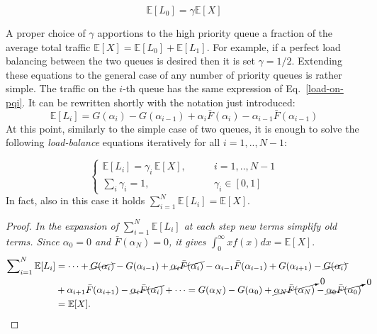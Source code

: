 \begin{equation}
\label{eq:main-gen}
\mathbb{E}[L_0] = \gamma \mathbb E[X] 
\end{equation}

A proper choice of $\gamma$ apportions to the high priority queue a fraction of the average total traffic $\mathbb{E}[X]  = \mathbb{E}[L_0] + \mathbb{E}[L_1]$. For example, if a perfect load balancing between the two queues is desired then it is set $\gamma = 1/2$.
Extending these equations to the general case of any number of priority queues is rather simple. The traffic on the $i$-th queue has the same expression of Eq.~\eqref{load-on-pqi}. It can be rewritten shortly with the notation just introduced:
\[
\mathbb{E}[L_i] = G(\alpha_i) - G(\alpha_{i-1}) + \alpha_i \bar{F}(\alpha_i) -\alpha_{i-1}\bar{F}(\alpha_{i-1})
\]
At this point, similarly to the simple case of two queues, it is enough to solve the following \emph{load-balance} equations iteratively for all $i = 1,..,N-1$:

\begin{equation}\label{eq:main-K-PQ}
\begin{cases}
\mathbb{E}[L_i] = \gamma_i \, \mathbb{E}[X],  \qquad &i = 1,..,N-1 \\
\sum_i \gamma_i = 1, \qquad &\gamma_i \in [0,1]
\end{cases}
\end{equation}
In fact, also in this case it holds $\sum_{i=1}^{N}\mathbb{E}[L_i] = \mathbb{E}[X]$.

\renewcommand{\qedsymbol}{\rule{0.5em}{0.5em}}
\begin{proof}
\label{proof}
\textit{In the expansion of $\sum _{i=1}^{N}\mathbb{E}[L_i]$ at each step new terms simplify old terms. Since $\alpha_{\mathit{0}} = 0$ and $\bar{F}(\alpha_N) = 0$, it gives $\int_{0}^\infty x f(x) dx = \mathbb{E}[X]$}.
\small
\begin{align*}
	\sum\nolimits_{i=1}^{N}\mathbb{E}[L_i] &= \cdots + \cancel{G(\alpha_i)} - G(\alpha_{i-1}) + \cancel{\alpha_i \bar{F}(\alpha_i)} 
	-\alpha_{i-1}\bar{F}(\alpha_{i-1}) + G(\alpha_{i+1}) - \cancel{G(\alpha_{i})} \\ &+ \alpha_{i+1} \bar{F}(\alpha_{i+1})- \cancel{\alpha_{i}\bar{F}(\alpha_{i})} + \cdots 
	=G(\alpha_N) - G(\alpha_0) + \cancelto{0}{\alpha_N \bar{F}(\alpha_N)} -\cancelto{0}{\alpha_0\bar{F}(\alpha_0)} \\
	&=\mathbb{E}[X].
\end{align*}
\normalsize
\end{proof}